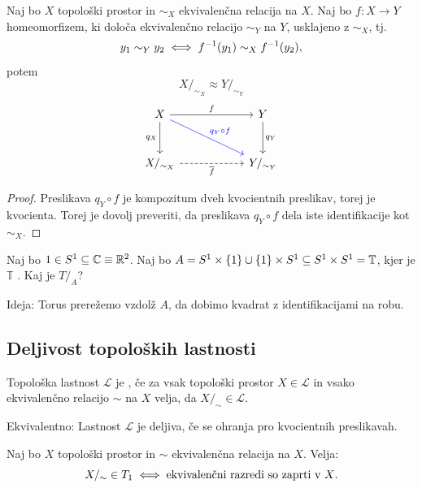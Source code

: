 \begin{trditev}
    Naj bo \(X\) topološki prostor in \(\sim_X\) ekvivalenčna relacija na \(X\). Naj bo \(f: X \to Y\) homeomorfizem, ki določa ekvivalenčno relacijo \(\sim_Y\) na \(Y\), usklajeno z \(\sim_X\), tj. 
    \[y_1 \sim_Y y_2 \iff f^{-1}(y_1) \sim_X f^{-1}(y_2),\]
    potem \[X/_{\sim_X} \approx Y/_{\sim_Y}\]
    \[
        \begin{tikzcd}[column sep=2cm, row sep=1cm]
            X \arrow{r}{f} \arrow[swap]{d}{q_X} \arrow[draw=blue]{rd}{\textcolor{blue}{q_Y \circ f}} & Y \arrow{d}{q_Y} \\
            X/_{\sim_X} \arrow[dashed, swap]{r}{\overline{f}} & Y/_{\sim_Y}
        \end{tikzcd}
    \]
\end{trditev}
\begin{proof}
    Preslikava \(q_Y \circ f\) je kompozitum dveh kvocientnih preslikav, torej je kvocienta. Torej je dovolj preveriti, da preslikava \(q_Y \circ f\) dela iste identifikacije kot \(\sim_X\).
\end{proof}

\begin{primer}
    Naj bo \(1 \in S^1 \subseteq \mathbb{C} \equiv \mathbb{R}^2\). Naj bo \(A = S^1 \times \left\{1\right\} \cup \left\{1\right\} \times S^1 \subseteq S^1 \times S^1 = \mathbb{T}\), kjer je \(\mathbb{T}\) . Kaj je \(T/_A\)?

    Ideja: Torus prerežemo vzdolž \(A\), da dobimo kvadrat z identifikacijami na robu.
\end{primer}

\subsection{Deljivost topoloških lastnosti}
\begin{definicija}
    Topološka lastnost \(\mathcal{L}\) je , če za vsak topološki prostor \(X \in \mathcal{L}\) in vsako ekvivalenčno relacijo \(\sim\) na \(X\) velja, da \(X/_\sim \in \mathcal{L}\).

    Ekvivalentno: Lastnost \(\mathcal{L}\) je deljiva, če se ohranja pro kvocientnih preslikavah.
\end{definicija}

\begin{trditev}
    Naj bo \(X\) topološki prostor in \(\sim\) ekvivalenčna relacija na \(X\). Velja:
    \[X/_\sim \in T_1 \iff \text{ekvivalenčni razredi so zaprti v \(X\)}.\]
\end{trditev}

